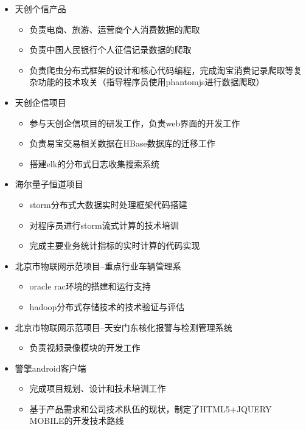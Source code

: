 \documentclass{resume}
\begin{document}
\begin{itemize}
  \item 天创个信产品
  \begin{itemize}
    \item 负责电商、旅游、运营商个人消费数据的爬取
    \item 负责中国人民银行个人征信记录数据的爬取
    \item 负责爬虫分布式框架的设计和核心代码编程，完成淘宝消费记录爬取等复杂功能的技术攻关（指导程序员使用phantomjs进行数据爬取）
  \end{itemize}
  \item 天创企信项目
  \begin{itemize}
    \item 参与天创企信项目的研发工作，负责web界面的开发工作
    \item 负责易宝交易相关数据在HBase数据库的迁移工作
    \item 搭建elk的分布式日志收集搜索系统
  \end{itemize}
\end{itemize}

\begin{itemize}
  \item 海尔量子恒道项目
  \begin{itemize}
    \item storm分布式大数据实时处理框架代码搭建
    \item 对程序员进行storm流式计算的技术培训
    \item 完成主要业务统计指标的实时计算的代码实现
  \end{itemize}
\end{itemize}

\begin{itemize}
  \item 北京市物联网示范项目--重点行业车辆管理系
  \begin{itemize}
    \item oracle rac环境的搭建和运行支持
    \item hadoop分布式存储技术的技术验证与评估
  \end{itemize}
  \item 北京市物联网示范项目--天安门东核化报警与检测管理系统
  \begin{itemize}
    \item 负责视频录像模块的开发工作
  \end{itemize}
  \item 警擎android客户端
  \begin{itemize}
    \item 完成项目规划、设计和技术培训工作
    \item 基于产品需求和公司技术队伍的现状，制定了HTML5+JQUERY MOBILE的开发技术路线
  \end{itemize}
\end{itemize}
\end{document}
